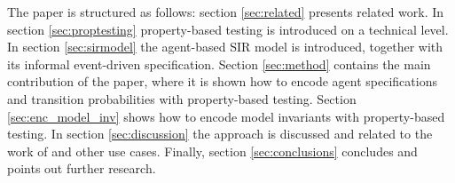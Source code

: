 The paper is structured as follows: section \ref{sec:related} presents related work. In section \ref{sec:proptesting} property-based testing is introduced on a technical level. In section \ref{sec:sirmodel} the agent-based SIR model is introduced, together with its informal event-driven specification. Section \ref{sec:method} contains the main contribution of the paper, where it is shown how to encode agent specifications and transition probabilities with property-based testing. Section \ref{sec:enc_model_inv} shows how to encode model invariants with property-based testing. In section \ref{sec:discussion} the approach is discussed and related to the work of \cite{thaler_show_2019} and other use cases. Finally, section \ref{sec:conclusions} concludes and points out further research.